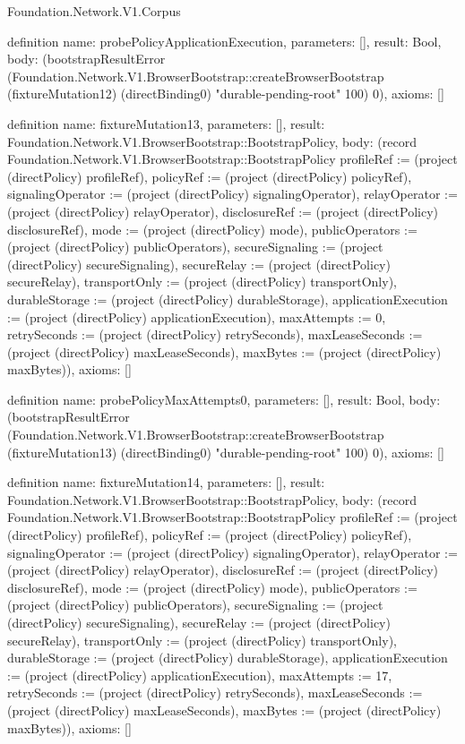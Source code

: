 \begin{lexlean}{Foundation.Network.V1.Corpus}
\begin{semanticmodule}
definition{
  name: probePolicyApplicationExecution,
  parameters: [],
  result: Bool,
  body: (bootstrapResultError (Foundation.Network.V1.BrowserBootstrap::createBrowserBootstrap (fixtureMutation12) (directBinding0) "durable-pending-root" 100) 0),
  axioms: []
}

definition{
  name: fixtureMutation13,
  parameters: [],
  result: Foundation.Network.V1.BrowserBootstrap::BootstrapPolicy,
  body: (record Foundation.Network.V1.BrowserBootstrap::BootstrapPolicy {profileRef := (project (directPolicy) profileRef), policyRef := (project (directPolicy) policyRef), signalingOperator := (project (directPolicy) signalingOperator), relayOperator := (project (directPolicy) relayOperator), disclosureRef := (project (directPolicy) disclosureRef), mode := (project (directPolicy) mode), publicOperators := (project (directPolicy) publicOperators), secureSignaling := (project (directPolicy) secureSignaling), secureRelay := (project (directPolicy) secureRelay), transportOnly := (project (directPolicy) transportOnly), durableStorage := (project (directPolicy) durableStorage), applicationExecution := (project (directPolicy) applicationExecution), maxAttempts := 0, retrySeconds := (project (directPolicy) retrySeconds), maxLeaseSeconds := (project (directPolicy) maxLeaseSeconds), maxBytes := (project (directPolicy) maxBytes)}),
  axioms: []
}

definition{
  name: probePolicyMaxAttempts0,
  parameters: [],
  result: Bool,
  body: (bootstrapResultError (Foundation.Network.V1.BrowserBootstrap::createBrowserBootstrap (fixtureMutation13) (directBinding0) "durable-pending-root" 100) 0),
  axioms: []
}

definition{
  name: fixtureMutation14,
  parameters: [],
  result: Foundation.Network.V1.BrowserBootstrap::BootstrapPolicy,
  body: (record Foundation.Network.V1.BrowserBootstrap::BootstrapPolicy {profileRef := (project (directPolicy) profileRef), policyRef := (project (directPolicy) policyRef), signalingOperator := (project (directPolicy) signalingOperator), relayOperator := (project (directPolicy) relayOperator), disclosureRef := (project (directPolicy) disclosureRef), mode := (project (directPolicy) mode), publicOperators := (project (directPolicy) publicOperators), secureSignaling := (project (directPolicy) secureSignaling), secureRelay := (project (directPolicy) secureRelay), transportOnly := (project (directPolicy) transportOnly), durableStorage := (project (directPolicy) durableStorage), applicationExecution := (project (directPolicy) applicationExecution), maxAttempts := 17, retrySeconds := (project (directPolicy) retrySeconds), maxLeaseSeconds := (project (directPolicy) maxLeaseSeconds), maxBytes := (project (directPolicy) maxBytes)}),
  axioms: []
}


\end{semanticmodule}
\end{lexlean}

